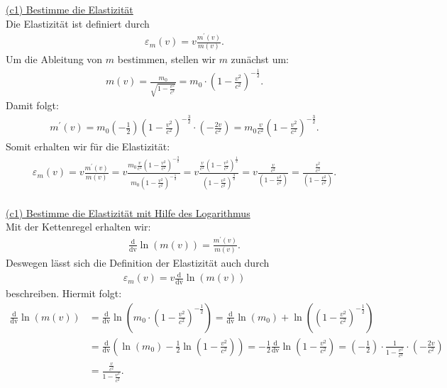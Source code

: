 \underline{(c1) Bestimme die Elastizität}\\
Die Elastizität ist definiert durch
\begin{align*}
	\varepsilon_m(v) = v \frac{m^\prime(v)}{m(v)}.
\end{align*}
Um die Ableitung von $ m $ bestimmen, stellen wir $ m $ zunächst um:
\begin{align*}
	m(v)
	=
	\frac{m_0}{\sqrt{1 - \frac{v^2}{c^2}}}
	= 
	m_0 \cdot \left(1 - \frac{v^2}{c^2}\right)^{-\frac{1}{2}}.
\end{align*}
Damit folgt:
\begin{align*}
	m^\prime(v)
	=
	m_0 \left(-\frac{1}{2}\right) \left(1 - \frac{v^2}{c^2}\right)^{-\frac{3}{2}} \cdot  \left(-\frac{2v}{c^2}\right)
	=
	m_0 \frac{v}{c^2} \left(1 - \frac{v^2}{c^2}\right)^{-\frac{3}{2}}.
\end{align*}
Somit erhalten wir für die Elastizität:
\begin{align*}
	\varepsilon_m(v)
	=
	v \frac{m^\prime(v)}{m(v)}
	=
	v
	\frac{m_0 \frac{v}{c^2} \left(1 - \frac{v^2}{c^2}\right)^{-\frac{3}{2}}}{m_0  \left(1 - \frac{v^2}{c^2}\right)^{-\frac{1}{2}}}
	=
	v
	\frac{\frac{v}{c^2} \left(1 - \frac{v^2}{c^2}\right)^{\frac{1}{2}}}{ \left(1 - \frac{v^2}{c^2}\right)^{\frac{3}{2}}}
	=
	v
	\frac{\frac{v}{c^2} }{ \left(1 - \frac{v^2}{c^2}\right)}
	=
	\frac{\frac{v^2}{c^2} }{ \left(1 - \frac{v^2}{c^2}\right)}.
\end{align*}
\ \\
\underline{(c1) Bestimme die Elastizität mit Hilfe des Logarithmus}\\
Mit der Kettenregel erhalten wir:
\begin{align*}
	\frac{\mathrm{d}}{\mathrm{dv}} \ln(m(v))
	=
	\frac{m^\prime(v)}{m(v)}.
\end{align*}
Deswegen lässt sich die Definition der Elastizität auch durch 
\begin{align*}
		\varepsilon_m(v) = v \frac{\mathrm{d}}{\mathrm{dv}}\ln(m(v))
\end{align*}
beschreiben. Hiermit folgt:
\begin{align*}
	\frac{\mathrm{d}}{\mathrm{dv}}\ln(m(v))
	&=
	\frac{\mathrm{d}}{\mathrm{dv}}
	\ln\left(	m_0 \cdot \left(1 - \frac{v^2}{c^2}\right)^{-\frac{1}{2}}\right)
	=
	\frac{\mathrm{d}}{\mathrm{dv}}
	\ln\left(	m_0 \right)+ \ln\left( \left(1 - \frac{v^2}{c^2}\right)^{-\frac{1}{2}}\right)\\
	&=
	\frac{\mathrm{d}}{\mathrm{dv}}\left(
	\ln\left(	m_0 \right)- \frac{1}{2} \ln\left( 1 - \frac{v^2}{c^2}\right)
	\right)
	=
	- \frac{1}{2}\frac{\mathrm{d}}{\mathrm{dv}}\ln\left( 1 - \frac{v^2}{c^2}\right)
	=
	\left(- \frac{1}{2}\right) \cdot  \frac{1}{1 - \frac{v^2}{c^2}} \cdot \left(-\frac{2v}{c^2}\right)\\
	&=
	\frac{\frac{v}{c^2}}{1 - \frac{v^2}{c^2}}.
\end{align*}



